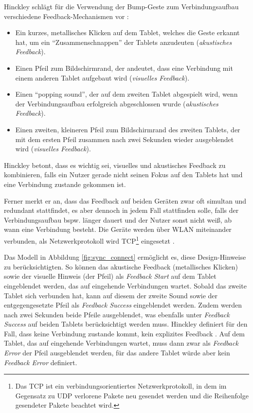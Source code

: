 Hinckley schlägt für die Verwendung der Bump-Geste zum Verbindungsaufbau verschiedene Feedback-Mechanismen vor \citep{Hinckley2003}:
\begin{itemize}
\item Ein kurzes, metallisches Klicken auf dem Tablet, welches die Geste erkannt hat, um ein "`Zusammenschnappen"' der Tablets anzudeuten (\textit{akustisches Feedback}).
\item Einen Pfeil zum Bildschirmrand, der andeutet, dass eine Verbindung mit einem anderen Tablet aufgebaut wird (\textit{visuelles Feedback}).
\item Einen "`popping sound"', der auf dem zweiten Tablet abgespielt wird, wenn der Verbindungsaufbau erfolgreich abgeschlossen wurde (\textit{akustisches Feedback}).
\item Einen zweiten, kleineren Pfeil zum Bildschirmrand des zweiten Tablets, der mit dem ersten Pfeil zusammen nach zwei Sekunden wieder ausgeblendet wird (\textit{visuelles Feedback}).
\end{itemize}

Hinckley betont, dass es wichtig sei, visuelles und akustisches Feedback zu kombinieren, falls ein Nutzer \zb gerade nicht seinen Fokus auf den Tablets hat und eine Verbindung zustande gekommen ist. 

Ferner merkt er an, dass das Feedback auf beiden Geräten zwar oft simultan und redundant stattfindet, es aber dennoch in jedem Fall stattfinden solle, falls der Verbindungsaufbau bspw. länger dauert und der Nutzer sonst nicht weiß, ab wann eine Verbindung besteht. Die Geräte werden  über WLAN miteinander verbunden, als Netzwerkprotokoll wird \acs{TCP}\footnote{Das \ac{TCP} ist ein verbindungsorientiertes Netzwerkprotokoll, in dem im Gegensatz zu \acs{UDP} verlorene Pakete neu gesendet werden und die Reihenfolge gesendeter Pakete beachtet wird.} eingesetzt \citep{Hinckley2003}.

Das Modell in Abbildung \ref{fig:sync_connect} ermöglicht es, diese Design-Hinweise zu berücksichtigten. So können das akustische Feedback (metallisches Klicken) sowie der visuelle Hinweis (der Pfeil) als \textit{Feedback Start} auf dem Tablet eingeblendet werden, das auf eingehende Verbindungen wartet. Sobald das zweite Tablet sich verbunden hat, kann auf diesem der zweite Sound sowie der entgegengesetzte Pfeil als \textit{Feedback Success} eingeblendet werden. Zudem werden nach zwei Sekunden beide Pfeile ausgeblendet, was ebenfalls unter \textit{Feedback Success} auf beiden Tablets berücksichtigt werden muss. Hinckley definiert für den Fall, dass keine Verbindung zustande kommt, kein explizites Feedback \citep{Hinckley2003}. Auf dem Tablet, das auf eingehende Verbindungen wartet, muss dann zwar als \textit{Feedback Error} der Pfeil ausgeblendet werden, für das andere Tablet würde aber kein \textit{Feedback Error} definiert. 

